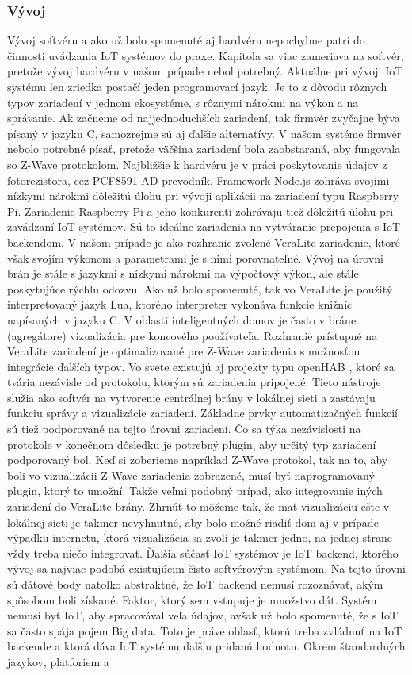 \subsubsection{Vývoj}
Vývoj softvéru a ako už bolo spomenuté aj hardvéru nepochybne patrí do činnosti uvádzania IoT systémov do praxe. Kapitola sa viac zameriava na softvér, pretože vývoj hardvéru v našom prípade nebol potrebný. Aktuálne pri vývoji IoT systému len zriedka postačí jeden programovací jazyk. Je to z dôvodu rôznych typov zariadení v jednom ekosystéme, s rôznymi nárokmi na výkon a na správanie. Ak začneme od najjednoduchších zariadení, tak firmvér zvyčajne býva písaný v jazyku C, samozrejme sú aj ďalšie alternatívy. V našom systéme firmvér nebolo potrebné písať, pretože väčšina zariadení bola zaobstaraná, aby fungovala so Z-Wave protokolom. Najbližšie k hardvéru je v práci poskytovanie údajov z fotorezistora, cez PCF8591 AD prevodník. Framework Node.js zohráva svojimi nízkymi nárokmi dôležitú úlohu pri vývoji aplikácii na zariadení typu Raspberry Pi. Zariadenie Raspberry Pi a jeho konkurenti zohrávaju tiež dôležitú úlohu pri zavádzaní IoT systémov. Sú to ideálne zariadenia na vytváranie prepojenia s IoT backendom. V našom prípade je ako rozhranie zvolené VeraLite zariadenie, ktoré však svojím výkonom a parametrami je s nimi porovnateľné. Vývoj na úrovni brán je stále s jazykmi s nízkymi nárokmi na výpočtový výkon, ale stále poskytujúce rýchlu odozvu. Ako už bolo spomenuté, tak vo VeraLite je použitý interpretovaný jazyk Lua, ktorého interpreter vykonáva funkcie knižníc napísaných v jazyku C. V oblasti inteligentných domov je často v bráne (agregátore) vizualizácia pre koncového používateľa. Rozhranie prístupné na VeraLite zariadení je optimalizované pre Z-Wave zariadenia s možnosťou integrácie ďalších typov. Vo svete existujú aj projekty typu openHAB \cite{IOT32}, ktoré sa tvária nezávisle od protokolu, ktorým sú zariadenia pripojené. Tieto nástroje služia ako softvér na vytvorenie centrálnej brány v lokálnej sieti a zastávaju funkciu správy a vizualizácie zariadení. Základne prvky automatizačných funkcií sú tiež podporované na tejto úrovni zariadení. Čo sa týka nezávislosti na protokole v konečnom dôsledku je potrebný plugin, aby určitý typ zariadení podporovaný bol. Keď si zoberieme napríklad Z-Wave protokol, tak na to, aby boli vo vizualizácii Z-Wave zariadenia zobrazené, musí byť naprogramovaný plugin, ktorý to umožní. Takže veľmi podobný prípad, ako integrovanie iných zariadení do VeraLite brány. Zhrnúť to môžeme tak, že mať vizualizáciu ešte v lokálnej sieti je takmer nevyhnutné, aby bolo možné riadiť dom aj v prípade výpadku internetu, ktorá vizualizácia sa zvolí je takmer jedno, na jednej strane vždy treba niečo integrovať. Ďalšia súčasť IoT systémov je IoT backend, ktorého vývoj sa najviac podobá existujúcim čisto softvérovým systémom. Na tejto úrovni sú dátové body natoľko abstraktné, že IoT backend nemusí rozoznávať, akým spôsobom boli získané. Faktor, ktorý sem vstupuje je množstvo dát. Systém nemusí byť IoT, aby spracovával veľa údajov, avšak už bolo spomenuté, že s IoT sa často spája pojem Big data. Toto je práve oblasť, ktorú treba zvládnuť na IoT backende a ktorá dáva IoT systému ďalšiu pridanú hodnotu. Okrem štandardných jazykov, platforiem a 